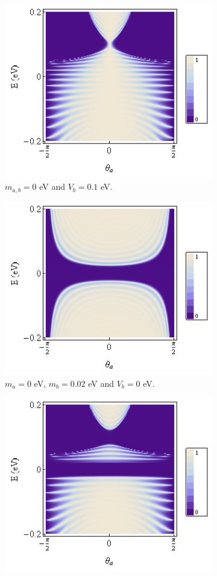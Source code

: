 \documentclass[12pt,a4paper]{report}
\begin{document}
\begin{figure}
	\begin{subfigure}{0.3\textwidth}
		\centerline{\includegraphics[scale=0.43]{images/potential}}
		\caption{$m_{a,b}=0$ eV and $V_{b}=0.1$ eV.}
	\end{subfigure}
	\hspace{0.5cm}
	\begin{subfigure}{0.3\textwidth}
		\centerline{\includegraphics[scale=0.43]{images/mass}}
		\caption{$m_{a}=0$ eV, $m_{b}=0.02$ eV and $V_{b}=0$ eV.}
	\end{subfigure}
	\hspace{0.5cm}
	\begin{subfigure}{0.3\textwidth}
		\centerline{\includegraphics[scale=0.43]{images/transmission}}

\end{subfigure}
\end{figure}
\end{document}
